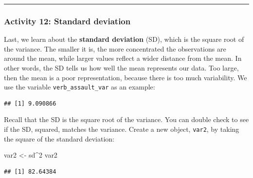 \documentclass[
]{book}
\newenvironment{Shaded}{\begin{snugshade}}{\end{snugshade}}
\newcommand{\AttributeTok}[1]{\textcolor[rgb]{0.77,0.63,0.00}{#1}}
\newcommand{\CommentTok}[1]{\textcolor[rgb]{0.56,0.35,0.01}{\textit{#1}}}
\newcommand{\ConstantTok}[1]{\textcolor[rgb]{0.00,0.00,0.00}{#1}}
\newcommand{\DecValTok}[1]{\textcolor[rgb]{0.00,0.00,0.81}{#1}}
\newcommand{\FunctionTok}[1]{\textcolor[rgb]{0.00,0.00,0.00}{#1}}
\newcommand{\NormalTok}[1]{#1}
\newcommand{\OtherTok}[1]{\textcolor[rgb]{0.56,0.35,0.01}{#1}}
\newcommand{\SpecialCharTok}[1]{\textcolor[rgb]{0.00,0.00,0.00}{#1}}
\begin{document}
\begin{center}\rule{0.5\linewidth}{0.5pt}\end{center}

\hypertarget{activity-12-standard-deviation}{%
\subsubsection{Activity 12: Standard deviation}\label{activity-12-standard-deviation}}

Last, we learn about the \textbf{standard deviation} (SD), which is the square root of the variance. The smaller it is, the more concentrated the observations are around the mean, while larger values reflect a wider distance from the mean. In other words, the SD tells us how well the mean represents our data. Too large, then the mean is a poor representation, because there is too much variability. We use the variable \texttt{verb\_assault\_var} as an example:

\begin{Shaded}
\end{Shaded}

\begin{verbatim}
## [1] 9.090866
\end{verbatim}

Recall that the SD is the square root of the variance. You can double check to see if the SD, squared, matches the variance. Create a new object, \texttt{var2}, by taking the square of the standard deviation:

\begin{Shaded}
\begin{Highlighting}[]
\NormalTok{var2 }\OtherTok{\textless{}{-}}\NormalTok{ sd}\SpecialCharTok{\^{}}\DecValTok{2}
\NormalTok{var2 }
\end{Highlighting}
\end{Shaded}

\begin{verbatim}
## [1] 82.64384
\end{verbatim}
\end{document}
